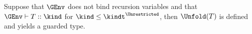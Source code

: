\begin{lemma}
  \label{lem:app:unfold-yields-guarded-types}
  Suppose that $\GEnv$ does not bind recursion variables and that
  $\GEnv \vdash T :: \kind$ for $\kind \le \kindt^\Unrestricted$, then $\Unfold (T)$ is defined and yields a
  guarded type.


\end{lemma}

